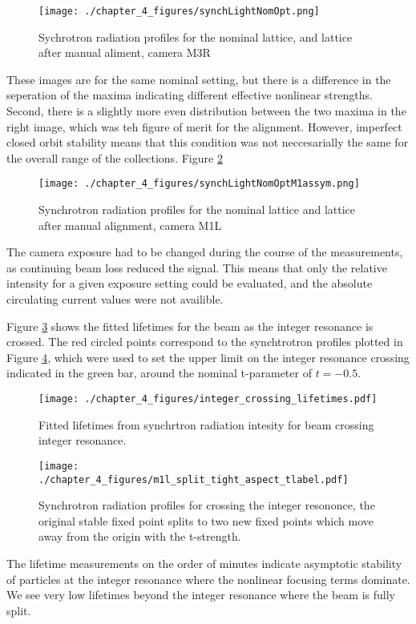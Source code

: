 \begin{figure}
	\centering
	\texttt{[image: ./chapter\_4\_figures/synchLightNomOpt.png]}
	\caption{Sychrotron radiation profiles for the nominal lattice, and lattice after manual aliment, camera M3R}
	\label{fig:synchCenter}
\end{figure}

These images are for the same nominal setting, but there is a difference in the seperation of the maxima indicating different effective nonlinear strengths. Second, there is a slightly more even distribution between the two maxima in the right image, which was teh figure of merit for the alignment. However, imperfect closed orbit stability means that this condition was not neccesarially the same for the overall range of the collections. Figure \ref{fig:synchAssym} 

\begin{figure}
	\centering
	\texttt{[image: ./chapter\_4\_figures/synchLightNomOptM1assym.png]}
	\caption{Synchrotron radiation profiles for the nominal lattice and lattice after manual alignment, camera M1L}
	\label{fig:synchAssym}
\end{figure}

The camera exposure had to be changed during the course of the measurements, as continuing beam loss reduced the signal. This means that only the relative intensity for a given exposure setting could be evaluated, and the absolute circulating current values were not availible.

Figure \ref{fig:synchLife} shows the fitted lifetimes for the beam as the integer resonance is crossed. The red circled points correspond to the synchtrotron profiles plotted in Figure \ref{fig:intCrossSynch}, which were used to set the upper limit on the integer resonance crossing indicated in the green bar, around the nominal t-parameter of $t=-0.5$. 

\begin{figure}
	\centering
	\texttt{[image: ./chapter\_4\_figures/integer\_crossing\_lifetimes.pdf]}
	\caption{Fitted lifetimes from synchrtron radiation intesity for beam crossing integer resonance.}
	\label{fig:synchLife}
\end{figure}

\begin{figure}
	\centering
	\texttt{[image: ./chapter\_4\_figures/m1l\_split\_tight\_aspect\_tlabel.pdf]}
	\caption{Synchrotron radiation profiles for crossing the integer resononce, the original stable fixed point splits to two new fixed points which move away from the origin with the t-strength.}
	\label{fig:intCrossSynch}
\end{figure}

The lifetime measurements on the order of minutes indicate asymptotic stability of particles at the integer resonance where the nonlinear focusing terms dominate. We see very low lifetimes beyond the integer resonance where the beam is fully split. 
